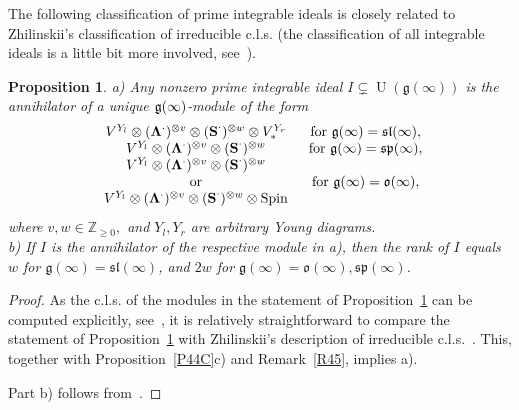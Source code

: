 \documentclass{emsprocart}
\newtheorem{proposition}[theorem]{Proposition}
\begin{document}
The following classification of prime integrable ideals is closely related to Zhilinskii's classification of irreducible c.l.s. (the classification of all integrable ideals is a little bit more involved, see~\cite[Theorem~7.9]{PP1}).
\begin{proposition}\label{Pclsm}a) Any nonzero prime integrable ideal $I\subsetneq \operatorname{U}(\mathfrak g(\infty))$ is the annihilator of a unique $\frak g(\infty)$-module of the form
$$\begin{array}{cc}V^{Y_l}\otimes({\bf \Lambda}^\cdot)^{\otimes v}\otimes(\operatorname{\bf S}^\cdot)^{\otimes w}\otimes V^{Y_r}_*&\mbox{for $\mathfrak g(\infty)=\mathfrak{sl}(\infty)$},\\
V^{Y_l}\otimes ({\bf \Lambda}^\cdot)^{\otimes v}\otimes(\operatorname{\bf S}^\cdot)^{\otimes w}&\mbox{for $\mathfrak g(\infty)=\mathfrak{sp}(\infty)$},\\
\begin{array}{c}V^{Y_l}\otimes ({\bf \Lambda}^\cdot)^{\otimes v}\otimes(\operatorname{\bf S}^\cdot)^{\otimes w}\\\mbox{or}\\V^{Y_l}\otimes({\bf \Lambda}^\cdot)^{\otimes v}\otimes(\operatorname{\bf S}^\cdot)^{\otimes w}\otimes\operatorname{Spin}\end{array}&\mbox{for $\mathfrak g(\infty)=\mathfrak o(\infty)$},\\
\end{array}$$
where $v, w\in\mathbb Z_{\ge0},$ and $Y_l, Y_r$ are arbitrary Young diagrams.\\
b) If $I$ is the annihilator of the respective module in a), then the rank of $I$ equals $w$ for $\mathfrak g(\infty)=\mathfrak{sl}(\infty)$, and $2w$ for $\mathfrak g(\infty)=\mathfrak o(\infty), \mathfrak{sp}(\infty)$.
\end{proposition}
\begin{proof} As the c.l.s. of the modules in the statement of Proposition~\ref{Pclsm} can be computed explicitly, see~\cite[Theorem~2.3]{PSt}, it is relatively straightforward to compare the statement of Proposition~\ref{Pclsm} with Zhilinskii's description of irreducible c.l.s.~\cite{Zh1}. This, together with Proposition~\ref{P44C}c) and Remark~\ref{R45}, implies a).

Part b) follows from~\cite[Section 7, formula (9)]{PP1}.\end{proof}
\end{document}
